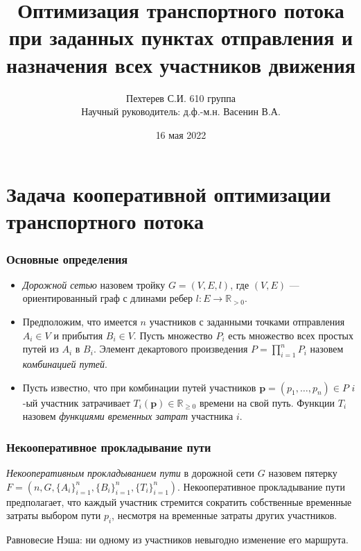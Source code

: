 \documentclass{beamer}
\begin{document}
\title{Оптимизация транспортного потока при заданных пунктах отправления и назначения всех участников движения}
\author{Пехтерев С.И. 610 группа\\Научный руководитель: д.ф.-м.н. Васенин В.А.}
\institute[]{}
\date[16.05.2022]{16 мая 2022}

\maketitle



\section{Задача кооперативной оптимизации транспортного потока}

\begin{frame}\frametitle{Основные определения}
  \begin{itemize}
	\item   \emph{Дорожной сетью} назовем тройку $G = (V, E, l)$, где $(V, E)$ --- ориентированный граф с длинами ребер $l: E \rightarrow \mathbb{R}_{>0} $.
	
	\item Предположим, что имеется $n$ участников с заданными точками отправления $A_i \in V$ и прибытия $B_i \in V$. Пусть множество $P_i$ есть множество всех простых путей из $A_i$ в $B_i$. Элемент декартового произведения ${P = \prod \limits_{i = 1} ^ n P_i}$ назовем \emph{комбинацией путей}.
	
	\item Пусть известно, что при комбинации путей участников $\textbf{p} = \left(p_1, \ldots, p_n\right)\in P$ $i$-ый участник затрачивает $T_i(\textbf{p}) \in \mathbb{R}_{\ge 0}$ времени на свой путь.  Функции $T_i$ назовем \textit{функциями временных затрат} участника $i$.
\end{itemize}
\end{frame}

\begin{frame}\frametitle{Некооперативное прокладывание пути}
  
  \textit{Некооперативным прокладыванием пути} в дорожной сети $G$ назовем пятерку $F = (n, G, \{A_i\}_{i = 1}^{n}, \{B_i\}_{i = 1}^{n}, \{T_i\}_{i = 1}^{n})$. Некооперативное прокладывание пути предполагает, что каждый участник стремится сократить собственные временные затраты выбором пути $p_i$, несмотря на временные затраты других участников.

\bigskip
Равновесие Нэша: ни одному из участников невыгодно изменение его маршрута.
  
\end{frame}
\end{document}
